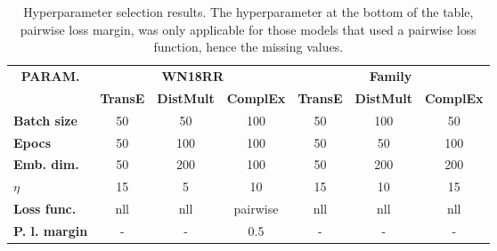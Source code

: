 \begin{table}[htbp]
\centering
\begin{tabular}{l|ccc|ccc}
\multicolumn{1}{c|}{\multirow{2}{*}{\textbf{PARAM.}}} & \multicolumn{3}{c|}{\textbf{WN18RR}}                                                                                  & \multicolumn{3}{c}{\textbf{Family}}                                                                                  \\%
\multicolumn{1}{c|}{}                                 & \multicolumn{1}{c}{\textbf{TransE}} & \multicolumn{1}{c}{\textbf{DistMult}} & \multicolumn{1}{c|}{\textbf{ComplEx}} & \multicolumn{1}{c}{\textbf{TransE}} & \multicolumn{1}{c}{\textbf{DistMult}} & \multicolumn{1}{c}{\textbf{ComplEx}} \\ \hline
\textbf{Batch size}                                 & 50                                   & 50                                     & 100                                   & 50                                   & 100                                    & 50                                    \\
\textbf{Epocs}                                         & 50                                   & 100                                    & 100                                   & 50                                   & 50                                     & 100                                   \\
\textbf{Emb. dim.}                                     & 50                                   & 200                                    & 100                                   & 50                                   & 200                                    & 200                                   \\
\textbf{$\eta$}                           & 15                                   & 5                                      & 10                                    & 15                                   & 10                                     & 15                                    \\
\textbf{Loss func.}                                 & nll                                  & nll                                    & pairwise                              & nll                                  & nll                                    & nll                                   \\
\textbf{P. l. margin}                                & -                                    & -                                      & 0.5                                   & -                                    & -                                      & -                                    
\end{tabular}
\caption[Hyperparameter selection results]{Hyperparameter selection results. The hyperparameter at the bottom of the table, pairwise loss margin, was only applicable for those models that used a pairwise loss function, hence the missing values.}
\label{hyperparameter_selection_results}
\end{table}


